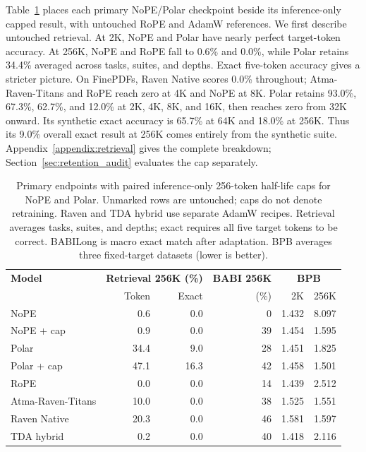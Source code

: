 \documentclass{article}
\begin{document}
Table~\ref{tab:endpoints} places each primary NoPE/Polar checkpoint beside its inference-only capped result, with untouched RoPE and AdamW references. We first describe untouched retrieval. At 2K, NoPE and Polar have nearly perfect target-token accuracy. At 256K, NoPE and RoPE fall to 0.6\% and 0.0\%, while Polar retains 34.4\% averaged across tasks, suites, and depths. Exact five-token accuracy gives a stricter picture. On FinePDFs, Raven Native scores 0.0\% throughout; Atma-Raven-Titans and RoPE reach zero at 4K and NoPE at 8K. Polar retains 93.0\%, 67.3\%, 62.7\%, and 12.0\% at 2K, 4K, 8K, and 16K, then reaches zero from 32K onward. Its synthetic exact accuracy is 65.7\% at 64K and 18.0\% at 256K. Thus its 9.0\% overall exact result at 256K comes entirely from the synthetic suite. Appendix~\ref{appendix:retrieval} gives the complete breakdown; Section~\ref{sec:retention_audit} evaluates the cap separately.

\begin{table}[t]
\centering
\small
\setlength{\tabcolsep}{4pt}
\begin{tabular}{lrrrrr}
\toprule
\textbf{Model} & \multicolumn{2}{c}{\textbf{Retrieval 256K (\%)}} & \textbf{BABI 256K} & \multicolumn{2}{c}{\textbf{BPB}} \\
 & Token & Exact & (\%) & 2K & 256K \\
\midrule
NoPE & 0.6 & 0.0 & 0 & 1.432 & 8.097 \\
NoPE + cap & 0.9 & 0.0 & 39 & 1.454 & 1.595 \\
Polar & 34.4 & 9.0 & 28 & 1.451 & 1.825 \\
Polar + cap & 47.1 & 16.3 & 42 & 1.458 & 1.501 \\
RoPE & 0.0 & 0.0 & 14 & 1.439 & 2.512 \\
\midrule
Atma-Raven-Titans & 10.0 & 0.0 & 38 & 1.525 & 1.551 \\
Raven Native & 20.3 & 0.0 & 46 & 1.581 & 1.597 \\
TDA hybrid & 0.2 & 0.0 & 40 & 1.418 & 2.116 \\
\bottomrule
\end{tabular}
\caption{Primary endpoints with paired inference-only 256-token half-life caps for NoPE and Polar. Unmarked rows are untouched; caps do not denote retraining. Raven and TDA hybrid use separate AdamW recipes. Retrieval averages tasks, suites, and depths; exact requires all five target tokens to be correct. BABILong is macro exact match after adaptation. BPB averages three fixed-target datasets (lower is better).}
\label{tab:endpoints}
\end{table}
\end{document}
